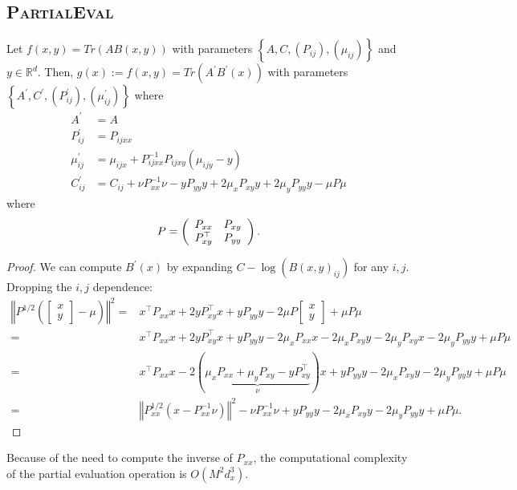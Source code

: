 \subsection{\textsc{PartialEval}}
\begin{proposition}
   Let $f(x, y) = Tr(AB(x, y))$ with parameters $\left\lbrace A, C, (P_{ij}), (\mu_{ij})\right\rbrace$ and $y\in \mathbb R^d$. Then, $g(x):=f(x, y) = Tr(A^\prime B^\prime(x))$ with parameters $\left\lbrace A^\prime, C^\prime, (P^\prime_{ij}), (\mu^\prime_{ij})\right\rbrace$ where
   \begin{align}
       A^\prime &= A\\
       P^\prime_{ij} &= P_{ijxx}\\
       \mu^\prime_{ij} &= \mu_{ijx} + P_{ijxx}^{-1}P_{ijxy}\left(\mu_{ijy} - y\right)\\
        C_{ij}^\prime &= C_{ij} + \nu P_{xx}^{-1}\nu - yP_{yy}y + 2\mu_{x}P_{xy}y + 2\mu_yP_{yy}y-\mu P\mu
       \end{align}
where \begin{equation}
P = \left(\begin{array}{c c}
    P_{xx} & P_{xy}  \\
    P_{xy}^\top  & P_{yy}
\end{array} \right).
\end{equation}
\end{proposition}
\begin{proof}
We can compute $B^\prime(x)$ by expanding $C - \log(B(x, y)_{ij})$ for any $i,j$. Dropping the $i,j$ dependence:
\begin{align}
     \left\Vert P^{1/2}\left(\begin{bmatrix}x\\ y\end{bmatrix} - \mu \right)\right\Vert^2 =&  x^\top P_{xx}x + 2y P_{xy}^\top x + yP_{yy}y - 2\mu P\begin{bmatrix}x\\ y\end{bmatrix}  + \mu P \mu\\
    =&  x^\top P_{xx}x + 2y P_{xy}^\top x + yP_{yy}y - 2\mu_x P_{xx}x -2\mu_xP_{xy}y -2\mu_yP_{xy}x -2\mu_yP_{yy}y + \mu P \mu\\
    =&  x^\top P_{xx}x -2(\underbrace{\mu_xP_{xx}+\mu_y P_{xy} -yP_{xy}^\top }_\nu)x + yP_{yy}y -2\mu_xP_{xy}y -2\mu_yP_{yy}y + \mu P \mu\\
    =&  \left\Vert P_{xx}^{1/2}\left(x - P_{xx}^{-1}\nu\right)\right\Vert^2 - \nu P_{xx}^{-1}\nu + yP_{yy}y -2\mu_xP_{xy}y -2\mu_yP_{yy}y + \mu P \mu.
\end{align}
\end{proof}
\begin{remark}
Because of the need to compute the inverse of $P_{xx}$, the computational complexity of the partial evaluation operation is $O(M^2d_x^3)$.
\end{remark}

